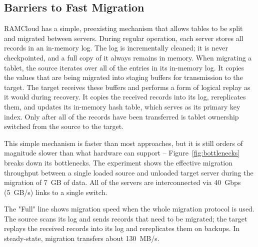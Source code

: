 \subsection{Barriers to Fast Migration}
\label{sec:bottlenecks}

RAMCloud has a simple, preexisting mechanism that allows tables to be split
and migrated between servers.
During regular operation, each server stores
all records in an in-memory log. The log is incrementally cleaned; it is
never checkpointed, and a full copy of it always remains in memory.
When migrating a tablet,
the source iterates over all of the entries in its
in-memory log. It copies the values that are being migrated into staging buffers for
transmission to the target. The target receives these buffers and performs a
form of logical replay as it would during recovery. It copies the received
records into its log, rereplicates them, and updates its in-memory hash
table, which serves as its primary key index. Only after all of the records
have been transferred is tablet ownership switched from the source to
the target.

This simple mechanism is faster than most
approaches,
but it is still orders of
magnitude slower than what hardware can support -- Figure~\ref{fig:bottlenecks}
breaks down its bottlenecks. The
experiment shows the effective migration throughput between a single loaded
source and unloaded target server during the migration of
7~GB of data.  All of the servers are interconnected via 40~Gbps (5~GB/s) links
to a single switch.

The "Full" line shows migration speed when the whole migration
protocol is used. The source scans its log and sends records that need to
be migrated; the target replays the received records into its log and
rereplicates them on backups.
In steady-state, migration transfers about 130~MB/s.

